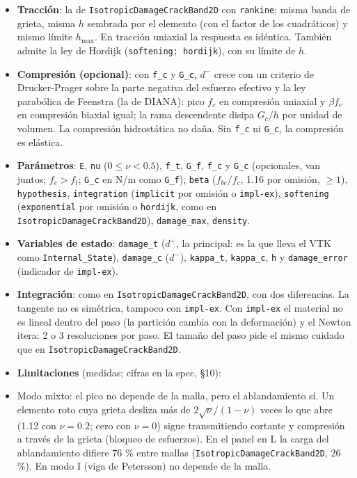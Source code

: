 \documentclass[11pt,oneside]{report}
\begin{document}
\begin{itemize}
  \item \textbf{Tracción}: la de \texttt{IsotropicDamageCrackBand2D} con \texttt{rankine}: misma banda de grieta, misma $h$ sembrada por el elemento (con el factor de los cuadráticos) y mismo límite $h_\text{max}$. En tracción uniaxial la respuesta es idéntica. También admite la ley de Hordijk (\texttt{softening: hordijk}), con su límite de $h$.
  \item \textbf{Compresión (opcional)}: con \texttt{f\_c} y \texttt{G\_c}, $d^-$ crece con un criterio de Drucker-Prager sobre la parte negativa del esfuerzo efectivo y la ley parabólica de Feenstra (la de DIANA): pico $f_c$ en compresión uniaxial y $\beta f_c$ en compresión biaxial igual; la rama descendente disipa $G_c/h$ por unidad de volumen. La compresión hidrostática no daña. Sin \texttt{f\_c} ni \texttt{G\_c}, la compresión es elástica.
  \item \textbf{Parámetros}: \texttt{E}, \texttt{nu} ($0 \le \nu < 0.5$), \texttt{f\_t}, \texttt{G\_f}, \texttt{f\_c} y \texttt{G\_c} (opcionales, van juntos; $f_c > f_t$; \texttt{G\_c} en N/m como \texttt{G\_f}), \texttt{beta} ($f_{bc}/f_c$, 1.16 por omisión, $\ge 1$), \texttt{hypothesis}, \texttt{integration} (\texttt{implicit} por omisión o \texttt{impl-ex}), \texttt{softening} (\texttt{exponential} por omisión o \texttt{hordijk}, como en \texttt{IsotropicDamageCrackBand2D}), \texttt{damage\_max}, \texttt{density}.
  \item \textbf{Variables de estado}: \texttt{damage\_t} ($d^+$, la principal: es la que lleva el VTK como \texttt{Internal\_State}), \texttt{damage\_c} ($d^-$), \texttt{kappa\_t}, \texttt{kappa\_c}, \texttt{h} y \texttt{damage\_error} (indicador de \texttt{impl-ex}).
  \item \textbf{Integración}: como en \texttt{IsotropicDamageCrackBand2D}, con dos diferencias. La tangente no es simétrica, tampoco con \texttt{impl-ex}. Con \texttt{impl-ex} el material no es lineal dentro del paso (la partición cambia con la deformación) y el Newton itera: 2 o 3 resoluciones por paso. El tamaño del paso pide el mismo cuidado que en \texttt{IsotropicDamageCrackBand2D}.
  \item \textbf{Limitaciones} (medidas; cifras en la spec, §10):
  \item Modo mixto: el pico no depende de la malla, pero el ablandamiento sí. Un elemento roto cuya grieta desliza más de $2\sqrt\nu/(1-\nu)$ veces lo que abre (1.12 con $\nu = 0.2$; cero con $\nu = 0$) sigue transmitiendo cortante y compresión a través de la grieta (bloqueo de esfuerzos). En el panel en L la carga del ablandamiento difiere 76 \% entre mallas (\texttt{IsotropicDamageCrackBand2D}, 26 \%). En modo I (viga de Petersson) no depende de la malla.

\end{itemize}
\end{document}
